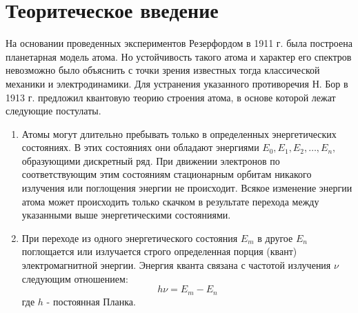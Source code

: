 
\usepackage{xcolor}
\usepackage{float}
\usepackage{hyperref}


\sloppy
\def\authors{Есюнин М.В., Есюнин Д.В.}
\def\sciadviser{Пикулин В.Д.}
\def\labname{Опыт Франка-Герца}
\renewcommand{\contentsname}{Оглавление}
\renewcommand{\figurename}{Рис.}
\renewcommand{\vec}{\mathbf}
\renewcommand{\phi}{\varphi}
\renewcommand{\kappa}{\varkappa}
\renewcommand{\Re}{\operatorname{Re}}
\renewcommand{\Im}{\operatorname{Im}}
\def\displaymath{\[}
\def\enddisplaymath{\]\@ignoretrue}


\begin{spacing}{1.2}
	\tableofcontents
\end{spacing}
\newpage
\section{Теоритеческое введение}
На основании проведенных экспериментов Резерфордом в 1911 г. была построена планетарная модель атома. Но устойчивость такого атома и характер его спектров невозможно было объяснить с точки зрения известных тогда классической механики и электродинамики. Для устранения указанного противоречия Н. Бор в 1913 г. предложил квантовую теорию строения атома, в основе которой лежат следующие постулаты.
\begin{enumerate}
\item {Атомы могут длительно пребывать только в определенных энергетических состояниях. В этих состояниях они обладают энергиями $E_0,E_1,E_2,\ldots,E_n,$ образующими дискретный ряд. При движении электронов по соответствующим этим состояниям стационарным орбитам никакого излучения или поглощения энергии не происходит. Всякое изменение энергии атома может происходить только скачком в результате перехода между указанными выше энергетическими состояниями.
}
\item {При переходе из одного энергетического состояния $E_m$ в другое $E_n$ поглощается или излучается строго определенная порция (квант) электромагнитной энергии. Энергия кванта связана с частотой излучения $\nu$ следующим отношением:
\begin{equation*}
	h\nu = E_m-E_n
\end{equation*}
где $h$ - постоянная Планка.
}
\end{enumerate}

